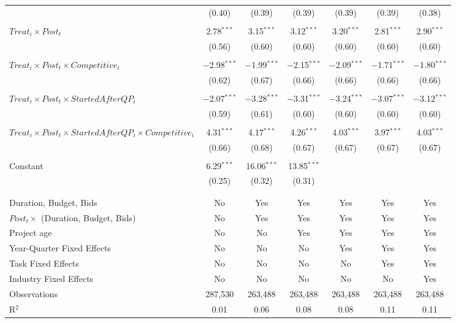 \documentclass[
]{article}
\begin{document}
\begin{table}[H]
\begin{tabular}{@{\extracolsep{-3pt}}lcccccc}
  & (0.40) & (0.39) & (0.39) & (0.39) & (0.39) & (0.38) \\ 
  & & & & & & \\ 
 $Treat_i \times Post_t$ & 2.78$^{***}$ & 3.15$^{***}$ & 3.12$^{***}$ & 3.20$^{***}$ & 2.81$^{***}$ & 2.90$^{***}$ \\ 
  & (0.56) & (0.60) & (0.60) & (0.60) & (0.60) & (0.60) \\ 
  & & & & & & \\ 
 $Treat_i \times Post_t \times Competitive_i$ & $-$2.98$^{***}$ & $-$1.99$^{***}$ & $-$2.15$^{***}$ & $-$2.09$^{***}$ & $-$1.71$^{***}$ & $-$1.80$^{***}$ \\ 
  & (0.62) & (0.67) & (0.66) & (0.66) & (0.66) & (0.66) \\ 
  & & & & & & \\ 
 $Treat_i \times Post_t \times StartedAfterQP_i$ & $-$2.07$^{***}$ & $-$3.28$^{***}$ & $-$3.31$^{***}$ & $-$3.24$^{***}$ & $-$3.07$^{***}$ & $-$3.12$^{***}$ \\ 
  & (0.59) & (0.61) & (0.60) & (0.60) & (0.60) & (0.60) \\ 
  & & & & & & \\ 
 $Treat_i \times Post_t \times StartedAfterQP_i \times Competitive_i$ & 4.31$^{***}$ & 4.17$^{***}$ & 4.26$^{***}$ & 4.03$^{***}$ & 3.97$^{***}$ & 4.03$^{***}$ \\ 
  & (0.66) & (0.68) & (0.67) & (0.67) & (0.67) & (0.67) \\ 
  & & & & & & \\ 
 Constant & 6.29$^{***}$ & 16.06$^{***}$ & 13.85$^{***}$ &  &  &  \\ 
  & (0.25) & (0.32) & (0.31) &  &  &  \\ 
  & & & & & & \\ 
\hline \\[-1.8ex] 
Duration, Budget, Bids & No & Yes & Yes & Yes & Yes & Yes \\ 
$Post_t \times $  (Duration, Budget, Bids) & No & Yes & Yes & Yes & Yes & Yes \\ 
Project age & No & No & Yes & Yes & Yes & Yes \\ 
Year-Quarter Fixed Effects & No & No & No & Yes & Yes & Yes \\ 
Task Fixed Effects & No & No & No & No & Yes & Yes \\ 
Industry Fixed Effects & No & No & No & No & No & Yes \\ 
Observations & 287,530 & 263,488 & 263,488 & 263,488 & 263,488 & 263,488 \\ 
R$^{2}$ & 0.01 & 0.06 & 0.08 & 0.08 & 0.11 & 0.11 \\ 

\end{tabular}
\end{table}
\end{document}
